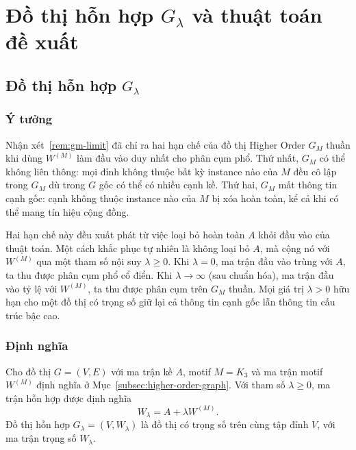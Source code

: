 
\chapter{Đồ thị hỗn hợp $G_\lambda$ và thuật toán đề xuất}
\label{chap:thuat-toan}

\section{Đồ thị hỗn hợp $G_\lambda$}
\label{sec:wlambda-def}

\subsection{Ý tưởng}
\label{subsec:wlambda-idea}

Nhận xét~\ref{rem:gm-limit} đã chỉ ra hai hạn chế của đồ thị Higher Order $G_M$ thuần khi dùng $W^{(M)}$ làm đầu vào duy nhất cho phân cụm phổ. Thứ nhất, $G_M$ có thể không liên thông: mọi đỉnh không thuộc bất kỳ instance nào của $M$ đều cô lập trong $G_M$ dù trong $G$ gốc có thể có nhiều cạnh kề. Thứ hai, $G_M$ mất thông tin cạnh gốc: cạnh không thuộc instance nào của $M$ bị xóa hoàn toàn, kể cả khi có thể mang tín hiệu cộng đồng.

Hai hạn chế này đều xuất phát từ việc loại bỏ hoàn toàn $A$ khỏi đầu vào của thuật toán. Một cách khắc phục tự nhiên là không loại bỏ $A$, mà cộng nó với $W^{(M)}$ qua một tham số nội suy $\lambda \geq 0$. Khi $\lambda = 0$, ma trận đầu vào trùng với $A$, ta thu được phân cụm phổ cổ điển. Khi $\lambda \to \infty$ (sau chuẩn hóa), ma trận đầu vào tỷ lệ với $W^{(M)}$, ta thu được phân cụm trên $G_M$ thuần. Mọi giá trị $\lambda > 0$ hữu hạn cho một đồ thị có trọng số giữ lại cả thông tin cạnh gốc lẫn thông tin cấu trúc bậc cao.

\subsection{Định nghĩa}
\label{subsec:wlambda-def}

\begin{definition}
\label{def:wlambda}
Cho đồ thị $G = (V, E)$ với ma trận kề $A$, motif $M = K_3$ và ma trận motif $W^{(M)}$ định nghĩa ở Mục~\ref{subsec:higher-order-graph}. Với tham số $\lambda \geq 0$, ma trận hỗn hợp được định nghĩa
\[
    W_\lambda = A + \lambda W^{(M)}.
\]
Đồ thị hỗn hợp $G_\lambda = (V, W_\lambda)$ là đồ thị có trọng số trên cùng tập đỉnh $V$, với ma trận trọng số $W_\lambda$.
\end{definition}

